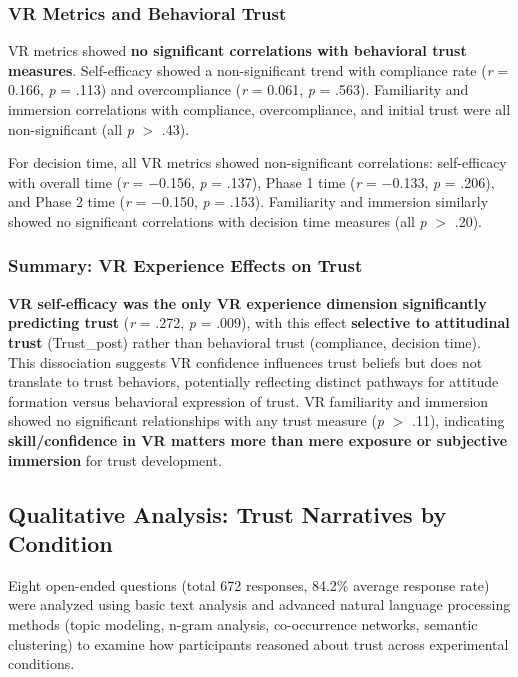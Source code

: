 \documentclass[12pt]{article}
\begin{document}
\subsubsection{VR Metrics and Behavioral Trust}

VR metrics showed \textbf{no significant correlations with behavioral trust measures}. Self-efficacy showed a non-significant trend with compliance rate (\textit{r} = 0.166, \textit{p} = .113) and overcompliance (\textit{r} = 0.061, \textit{p} = .563). Familiarity and immersion correlations with compliance, overcompliance, and initial trust were all non-significant (all \textit{p} $>$ .43).

For decision time, all VR metrics showed non-significant correlations: self-efficacy with overall time (\textit{r} = $-$0.156, \textit{p} = .137), Phase 1 time (\textit{r} = $-$0.133, \textit{p} = .206), and Phase 2 time (\textit{r} = $-$0.150, \textit{p} = .153). Familiarity and immersion similarly showed no significant correlations with decision time measures (all \textit{p} $>$ .20).

\subsubsection{Summary: VR Experience Effects on Trust}

\textbf{VR self-efficacy was the only VR experience dimension significantly predicting trust} (\textit{r} = .272, \textit{p} = .009), with this effect \textbf{selective to attitudinal trust} (Trust\_post) rather than behavioral trust (compliance, decision time). This dissociation suggests VR confidence influences trust beliefs but does not translate to trust behaviors, potentially reflecting distinct pathways for attitude formation versus behavioral expression of trust. VR familiarity and immersion showed no significant relationships with any trust measure (\textit{p} $>$ .11), indicating \textbf{skill/confidence in VR matters more than mere exposure or subjective immersion} for trust development.

\subsection{Qualitative Analysis: Trust Narratives by Condition}

Eight open-ended questions (total 672 responses, 84.2\% average response rate) were analyzed using basic text analysis and advanced natural language processing methods (topic modeling, n-gram analysis, co-occurrence networks, semantic clustering) to examine how participants reasoned about trust across experimental conditions.
\end{document}
